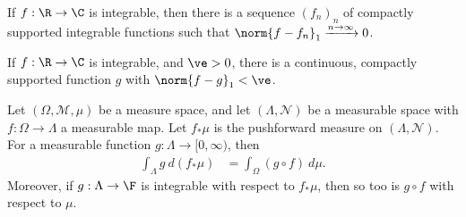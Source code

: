 \begin{corollary}
  If $f: \R\rightarrow\C$ is integrable, then there is a sequence $\left(f_n\right)_n$ of compactly supported integrable functions such that $\norm{f - f_n}_{1}\xrightarrow{n\rightarrow\infty} 0$.
\end{corollary}
\begin{theorem}
  If $f: \R\rightarrow\C$ is integrable, and $\ve > 0$, there is a continuous, compactly supported function $g$ with $\norm{f - g}_{1} < \ve$.
\end{theorem}
\begin{proposition}
  Let $\left(\Omega,\mathcal{M},\mu\right)$ be a measure space, and let $\left(\Lambda,\mathcal{N}\right)$ be a measurable space with $f: \Omega\rightarrow \Lambda$ a measurable map. Let $f_{\ast}\mu$ is the pushforward measure on $\left(\Lambda,\mathcal{N}\right)$. For a measurable function $g: \Lambda\rightarrow [0,\infty)$, then
  \begin{align*}
    \int_{\Lambda}^{} g\:d\left(f_{\ast}\mu\right) &= \int_{\Omega}^{} \left(g\circ f\right)\:d\mu.
  \end{align*}
  Moreover, if $g: \Lambda\rightarrow \F$ is integrable with respect to $f_{\ast}\mu$, then so too is $g\circ f$ with respect to $\mu$.
\end{proposition}
